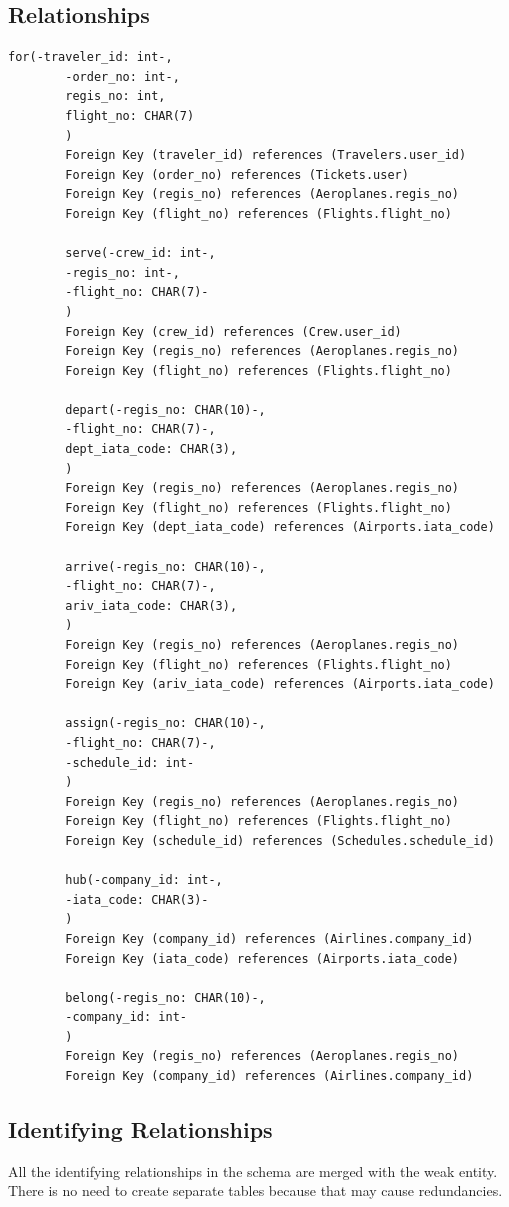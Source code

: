 \documentclass{article}
\begin{document}
	\subsection{Relationships}
	\begin{lstlisting}[keepspaces=true]
		for(-traveler_id: int-, 
		-order_no: int-,
		regis_no: int, 
		flight_no: CHAR(7)
		)
		Foreign Key (traveler_id) references (Travelers.user_id)
		Foreign Key (order_no) references (Tickets.user)
		Foreign Key (regis_no) references (Aeroplanes.regis_no)
		Foreign Key (flight_no) references (Flights.flight_no)
		
		serve(-crew_id: int-, 
		-regis_no: int-, 
		-flight_no: CHAR(7)-
		)
		Foreign Key (crew_id) references (Crew.user_id)
		Foreign Key (regis_no) references (Aeroplanes.regis_no)
		Foreign Key (flight_no) references (Flights.flight_no)
		
		depart(-regis_no: CHAR(10)-,
		-flight_no: CHAR(7)-,
		dept_iata_code: CHAR(3),
		)  
		Foreign Key (regis_no) references (Aeroplanes.regis_no)
		Foreign Key (flight_no) references (Flights.flight_no)
		Foreign Key (dept_iata_code) references (Airports.iata_code)
		
		arrive(-regis_no: CHAR(10)-,
		-flight_no: CHAR(7)-,
		ariv_iata_code: CHAR(3),
		)  
		Foreign Key (regis_no) references (Aeroplanes.regis_no)
		Foreign Key (flight_no) references (Flights.flight_no)
		Foreign Key (ariv_iata_code) references (Airports.iata_code)
		
		assign(-regis_no: CHAR(10)-,
		-flight_no: CHAR(7)-,
		-schedule_id: int-
		)
		Foreign Key (regis_no) references (Aeroplanes.regis_no)
		Foreign Key (flight_no) references (Flights.flight_no)
		Foreign Key (schedule_id) references (Schedules.schedule_id)
		
		hub(-company_id: int-,
		-iata_code: CHAR(3)-
		)
		Foreign Key (company_id) references (Airlines.company_id)
		Foreign Key (iata_code) references (Airports.iata_code)
		
		belong(-regis_no: CHAR(10)-,
		-company_id: int-
		)
		Foreign Key (regis_no) references (Aeroplanes.regis_no)
		Foreign Key (company_id) references (Airlines.company_id)
	\end{lstlisting}
	
	\subsection{Identifying Relationships}
	All the identifying relationships in the schema are merged with the weak entity. There is no need to create separate tables because that may cause redundancies.
	
\end{document}
